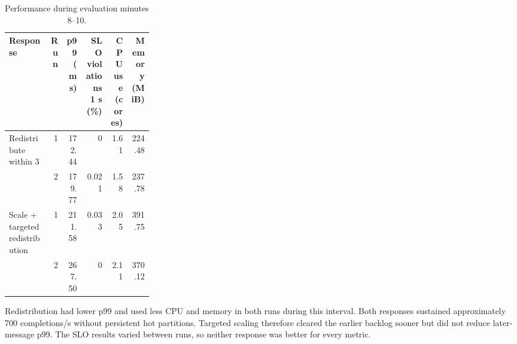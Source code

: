 \begin{table}[H]
\centering\small
\setlength{\tabcolsep}{3pt}
\renewcommand{\arraystretch}{1.15}
\begin{tabular}{@{}p{0.28\linewidth}rrrrr@{}}
\toprule
\textbf{Response} & \textbf{Run} & \shortstack{\textbf{p99}\\\textbf{(ms)}} & \shortstack{\textbf{SLO violations}\\\textbf{1 s (\%)}} & \shortstack{\textbf{CPU use}\\\textbf{(cores)}} & \shortstack{\textbf{Memory}\\\textbf{(MiB)}}\\
\midrule
Redistribute within 3 & 1 & 172.44 & 0 & 1.61 & 224.48\\
 & 2 & 179.77 & 0.021 & 1.58 & 237.78\\
Scale + targeted redistribution & 1 & 211.58 & 0.033 & 2.05 & 391.75\\
 & 2 & 267.50 & 0 & 2.11 & 370.12\\
\bottomrule
\end{tabular}
\caption{Performance during evaluation minutes 8--10.}
\label{tab:four-condition-after-recovery}
\end{table}

Redistribution had lower p99 and used less CPU and memory in both runs during this interval. Both responses sustained approximately 700 completions/s without persistent hot partitions. Targeted scaling therefore cleared the earlier backlog sooner but did not reduce later-message p99. The SLO results varied between runs, so neither response was better for every metric.

